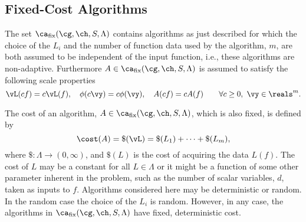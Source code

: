 \documentclass[final]{elsarticle}
\theoremstyle{definition}
\theoremstyle{remark}
\DeclareMathOperator{\fix}{fix}
\begin{document}
\subsection{Fixed-Cost Algorithms}

The set $\ca_{\fix}(\cg,\ch,S,\Lambda)$ contains algorithms as just described for which the choice of the $L_i$ and the number of function data used by the algorithm, $m$, are both assumed to be independent of the input function, i.e., these algorithms are non-adaptive.  Furthermore $A \in \ca_{\fix}(\cg,\ch,S,\Lambda)$ is assumed to satisfy the following scale properties
\begin{equation}
\label{algoscale}
\vL(cf) = c \vL(f), \quad 
\phi(c\vy) = c\phi(\vy), \quad A(cf) = cA(f) \qquad \forall c \ge 0, \ \vy \in \reals^m.
\end{equation}

The cost of an algorithm, $A \in  \ca_{\fix}(\cg,\ch,S,\Lambda)$, which is also fixed, is defined by
\begin{equation} \label{costfix}
\cost(A) = \$(\vL) = \$(L_1) + \cdots +\$(L_m),
\end{equation}
where $\$:\Lambda \to (0,\infty)$, and $\$(L)$ is the cost of acquiring the data $L(f)$. The cost of $L$ may be a constant for all $L \in \Lambda$ or it might be a function of some other parameter inherent in the problem, such as the number of scalar variables, $d$, taken as inputs to $f$. Algorithms considered here may be deterministic or random.  In the random case the choice of the $L_i$ is random.  However, in any case, the algorithms in $\ca_{\fix}(\cg,\ch,S,\Lambda)$ have fixed, deterministic cost.
\end{document}
